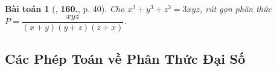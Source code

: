 \documentclass{article}
\numberwithin{equation}{section}
\newtheorem{baitoan}{Bài toán}[section]
\begin{document}
\begin{baitoan}[\cite{Tuyen_Toan_8}, \textbf{160.}, p. 40]
	Cho $x^3 + y^3 + z^3 = 3xyz$, rút gọn phân thức $P = \dfrac{xyz}{(x + y)(y + z)(z + x)}$.
\end{baitoan}



\subsection{Các Phép Toán về Phân Thức Đại Số}


\printbibliography[heading=bibintoc]
	
\end{document}
